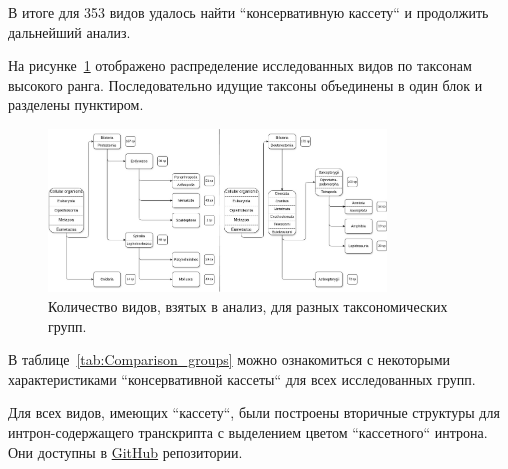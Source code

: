В итоге для 353 видов удалось найти ``консервативную кассету`` и продолжить дальнейший анализ.


На рисунке~\ref{fig:tree_summary} отображено распределение исследованных видов по таксонам высокого ранга.
Последовательно идущие таксоны объединены в один блок и разделены пунктиром.

\begin{figure}[h] %
    \centering
    \includegraphics[width=0.8\textwidth]{images/Tree_summary}
    \caption{Количество видов, взятых в анализ, для разных таксономических групп.}
    \label{fig:tree_summary}
\end{figure}

В таблице~\ref{tab:Comparison_groups} можно ознакомиться с некоторыми характеристиками ``консервативной кассеты`` для всех исследованных групп.

Для всех видов, имеющих ``кассету``, были построены вторичные структуры для интрон-содержащего транскрипта с выделением цветом ``кассетного`` интрона.
Они доступны в \href{https://github.com/ArtemVaska/Diploma}{GitHub} репозитории.


